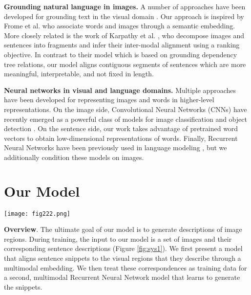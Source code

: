 \documentclass[10pt,twocolumn,letterpaper]{article}
\begin{document}
\textbf{Grounding natural language in images.} A number of approaches have been developed for grounding text in the visual domain \cite{kong2014you,matuszek2012,zitnicklearning,linvisual}. Our approach is inspired by Frome et al. \cite{frome2013devise} who associate words and images through a semantic embedding. More closely related is the work of Karpathy et al. \cite{defrag}, who decompose images and sentences into fragments and infer their inter-modal alignment using a ranking objective. In contrast to their model which is based on grounding dependency tree relations, our model aligns contiguous segments of sentences which are more meaningful, interpretable, and not fixed in length.

\textbf{Neural networks in visual and language domains.} Multiple approaches have been developed for representing images and words in higher-level representations. On the image side, Convolutional Neural Networks (CNNs) \cite{lecun1998gradient,krizhevsky2012imagenet} have recently emerged as a powerful class of models for image classification and object detection \cite{ilsvrc}. On the sentence side, our work takes advantage of pretrained word vectors \cite{mikolov2013distributed,jeffreypenningtonglove,bengio2006neural} to obtain low-dimensional representations of words. Finally, Recurrent Neural Networks have been previously used in language modeling \cite{mikolov2010recurrent,sutskever2011generating}, but we additionally condition these models on images.

\vspace{-0.1in}
\section{Our Model}
\vspace{-0.15in}

\begin{figure*}[t]
\texttt{[image: fig222.png]}
\caption{Overview of our approach. A dataset of images and their sentence descriptions is the input to our model (left). Our model first infers the correspondences (middle, Section \ref{sec:align}) and then learns to generate novel descriptions (right, Section \ref{sec:generate}).}
\vspace{-0.1in}
\label{fig:sys1}
\end{figure*}

\textbf{Overview}. The ultimate goal of our model is to generate descriptions of image regions. During training, the input to our model is a set of images and their corresponding sentence descriptions (Figure \ref{fig:sys1}). We first present a model that aligns sentence snippets to the visual regions that they describe through a multimodal embedding. We then treat these correspondences as training data for a second, multimodal Recurrent Neural Network model that learns to generate the snippets.
\end{document}
